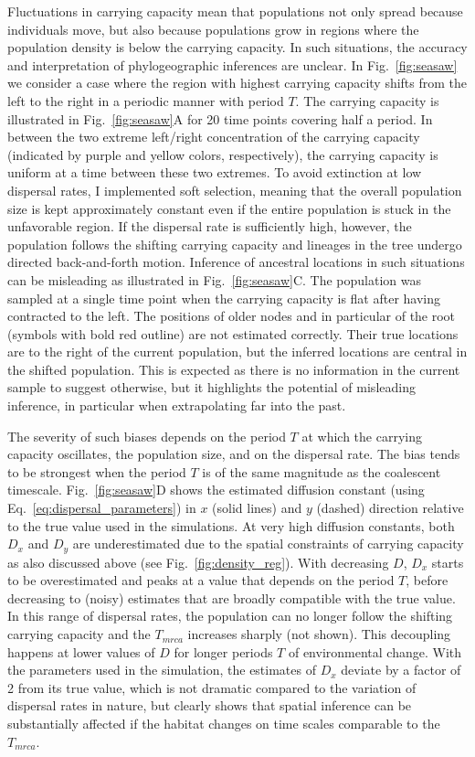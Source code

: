\documentclass[aps,rmp, twocolumn]{revtex4}
\begin{document}
Fluctuations in carrying capacity mean that populations not only spread because individuals move, but also because populations grow in regions where the population density is below the carrying capacity.
In such situations, the accuracy and interpretation of phylogeographic inferences are unclear.
In Fig.~\ref{fig:seasaw} we consider a case where the region with highest carrying capacity shifts from the left to the right in a periodic manner with period $T$.
The carrying capacity is illustrated in Fig.~\ref{fig:seasaw}A for 20 time points covering half a period.
In between the two extreme left/right concentration of the carrying capacity (indicated by purple and yellow colors, respectively), the carrying capacity is uniform at a time between these two extremes.
To avoid extinction at low dispersal rates, I implemented soft selection, meaning that the overall population size is kept approximately constant even if the entire population is stuck in the unfavorable region.
If the dispersal rate is sufficiently high, however, the population follows the shifting carrying capacity and lineages in the tree undergo directed back-and-forth motion.
Inference of ancestral locations in such situations can be misleading as illustrated in Fig.~\ref{fig:seasaw}C.
The population was sampled at a single time point when the carrying capacity is flat after having contracted to the left.
The positions of older nodes and in particular of the root (symbols with bold red outline) are not estimated correctly.
Their true locations are to the right of the current population, but the inferred locations are central in the shifted population.
This is expected as there is no information in the current sample to suggest otherwise, but it highlights the potential of misleading inference, in particular when extrapolating far into the past.

The severity of such biases depends on the period $T$ at which the carrying capacity oscillates, the population size, and on the dispersal rate. The bias tends to be strongest when the period $T$ is of the same magnitude as the coalescent timescale.
Fig.~\ref{fig:seasaw}D shows the estimated diffusion constant (using Eq.~\ref{eq:dispersal_parameters}) in $x$ (solid lines) and $y$ (dashed) direction relative to the true value used in the simulations.
At very high diffusion constants, both $D_x$ and $D_y$ are underestimated due to the spatial constraints of carrying capacity as also discussed above (see Fig.~\ref{fig:density_reg}).
With decreasing $D$, $D_x$ starts to be overestimated and peaks at a value that depends on the period $T$, before decreasing to (noisy) estimates that are broadly compatible with the true value.
In this range of dispersal rates, the population can no longer follow the shifting carrying capacity and the $T_{mrca}$ increases sharply (not shown).
This decoupling happens at lower values of $D$ for longer periods $T$ of environmental change.
With the parameters used in the simulation, the estimates of $D_x$ deviate by a factor of 2 from its true value, which is not dramatic compared to the variation of dispersal rates in nature, but clearly shows that spatial inference can be substantially affected if the habitat changes on time scales comparable to the $T_{mrca}$.
\end{document}

